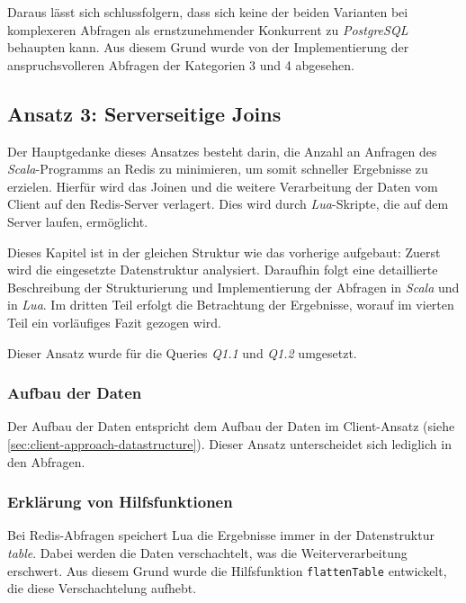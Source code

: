Daraus lässt sich schlussfolgern, dass sich keine der beiden Varianten bei komplexeren Abfragen als ernstzunehmender Konkurrent zu \emph{PostgreSQL} behaupten kann. Aus diesem Grund wurde von der Implementierung der anspruchsvolleren Abfragen der Kategorien 3 und 4 abgesehen.





\subsection{Ansatz 3: Serverseitige Joins}
Der Hauptgedanke dieses Ansatzes besteht darin, die Anzahl an Anfragen des \emph{Scala}-Programms an Redis zu minimieren, um somit schneller Ergebnisse zu erzielen.
Hierfür wird das Joinen und die weitere Verarbeitung der Daten vom Client auf den Redis-Server verlagert. Dies wird durch \emph{Lua}-Skripte, die auf dem Server laufen, ermöglicht.

Dieses Kapitel ist in der gleichen Struktur wie das vorherige aufgebaut:
Zuerst wird die eingesetzte Datenstruktur analysiert. Daraufhin folgt eine detaillierte Beschreibung der Strukturierung und Implementierung der Abfragen in \emph{Scala} und in \emph{Lua}. Im dritten Teil erfolgt die Betrachtung der Ergebnisse, worauf im vierten Teil ein vorläufiges Fazit gezogen wird.

Dieser Ansatz wurde für die Queries \emph{Q1.1} und \emph{Q1.2} umgesetzt.

\subsubsection{Aufbau der Daten}
Der Aufbau der Daten entspricht dem Aufbau der Daten im Client-Ansatz (siehe \cref{sec:client-approach-datastructure}). Dieser Ansatz unterscheidet sich lediglich in den Abfragen.

\subsubsection{Erklärung von Hilfsfunktionen}
Bei Redis-Abfragen speichert Lua die Ergebnisse immer in der Datenstruktur \emph{table}. Dabei werden die Daten verschachtelt, was die Weiterverarbeitung erschwert. Aus diesem Grund wurde die Hilfsfunktion \lstinline|flattenTable| entwickelt, die diese Verschachtelung aufhebt.

